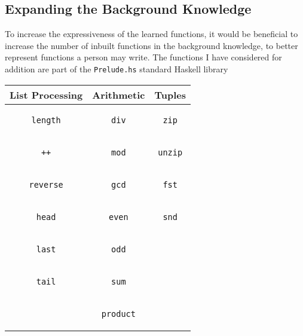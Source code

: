 \subsection{Expanding the Background Knowledge}
To increase the expressiveness of the learned functions, it would be beneficial to increase the number of inbuilt functions in the background knowledge, to better represent functions a person may write. The functions I have considered for addition are part of the \lstinline{Prelude.hs} standard Haskell library %
\begin{center}
\begin{tabular}{ c | c | c }
\textbf{List Processing} & \textbf{Arithmetic} & \textbf{Tuples} \\
\hline
\begin{lstlisting}
length
\end{lstlisting} 
& 
\begin{lstlisting}
div
\end{lstlisting} 
& 
\begin{lstlisting}
zip
\end{lstlisting}
\\
\begin{lstlisting}
++
\end{lstlisting}
& 
\begin{lstlisting}
mod
\end{lstlisting}
&
\begin{lstlisting}
unzip
\end{lstlisting}
\\
\begin{lstlisting}
reverse
\end{lstlisting}
& 
\begin{lstlisting}
gcd
\end{lstlisting}
& 
\begin{lstlisting}
fst
\end{lstlisting}
\\
\begin{lstlisting}
head
\end{lstlisting}
& 
\begin{lstlisting}
even
\end{lstlisting}
& 
\begin{lstlisting}
snd
\end{lstlisting}
\\
\begin{lstlisting}
last
\end{lstlisting}
& 
\begin{lstlisting}
odd
\end{lstlisting}
& \\
\begin{lstlisting}
tail
\end{lstlisting}
&
\begin{lstlisting}
sum
\end{lstlisting}
& \\
&
\begin{lstlisting}
product
\end{lstlisting}
 & 
\end{tabular}
\end{center}

